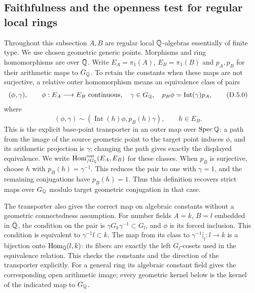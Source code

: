 \subsection{Faithfulness and the openness test for regular local rings}

Throughout this subsection $A,B$ are regular local $\mathbb Q$-algebras
essentially of finite type.  We use chosen geometric generic points.
Morphisms and ring homomorphisms are over $\mathbb Q$.  Write
$E_A=\pi_1(A)$, $E_B=\pi_1(B)$ and $p_A,p_B$ for their arithmetic
maps to $G_\mathbb Q$.  To retain the constants when these maps are not
surjective, a relative outer homomorphism means an equivalence
class of pairs
\[
 (\phi,\gamma),\qquad
 \phi:E_A\longrightarrow E_B\text{ continuous},\quad
 \gamma\in G_\mathbb Q,\quad
 p_B\phi=\operatorname{Int}(\gamma)p_A,
 \tag{D.5.0}
\]
where
\[
 (\phi,\gamma)\sim
       (\operatorname{Int}(h)\phi,p_B(h)\gamma),\qquad h\in E_B.
\]
This is the explicit base-point transporter in an outer map over
$\operatorname{Spec}\mathbb Q$: a path from the image of the source
geometric point to the target point induces $\phi$, and its
arithmetic projection is $\gamma$; changing the path gives exactly
the displayed equivalence.  We write
$\operatorname{Hom}^{\rm out}_{/G_\mathbb Q}(E_A,E_B)$ for these classes.
When $p_B$ is surjective, choose $h$ with $p_B(h)=\gamma^{-1}$.
This reduces the pair to one with $\gamma=1$, and the remaining
conjugations have $p_B(h)=1$.  Thus this definition recovers
strict maps over $G_\mathbb Q$ modulo target geometric conjugation in
that case.

The transporter also gives the correct map on algebraic constants
without a geometric connectedness assumption.  For number fields
$A=k$, $B=l$ embedded in $\bar{\mathbb Q}$, the condition on the pair is
$\gamma G_k\gamma^{-1}\subset G_l$, and $\phi$ is its forced
inclusion.  This condition is equivalent to $\gamma^{-1}l\subset k$.
The map from its class to $\gamma^{-1}|_l:l\to k$ is a bijection
onto $\operatorname{Hom}_\mathbb Q(l,k)$: its fibers are exactly the
left $G_l$-cosets used in the equivalence relation.  This checks
the constants and the direction of the transporter explicitly.
For a general ring its algebraic constant field gives the
corresponding open arithmetic image; every geometric kernel below
is the kernel of the indicated map to $G_\mathbb Q$.

